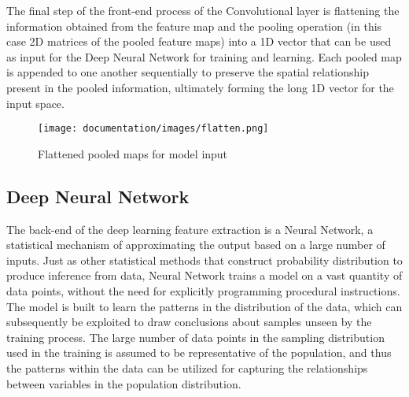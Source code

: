 \documentclass[solid,math,chem,code,plot,gloss]{bmc}
\begin{document}
The final step of the front-end process of the Convolutional layer is flattening the information obtained from the feature map and the pooling operation (in this case 2D matrices of the pooled feature maps) into a 1D vector that can be used as input for the Deep Neural Network for training and learning. Each pooled map is appended to one another sequentially to preserve the spatial relationship present in the pooled information, ultimately forming the long 1D vector for the input space.

\begin{figure}[hbt!]
    \centering
    \texttt{[image: documentation/images/flatten.png]}
    \caption{Flattened pooled maps for model input}
    \label{fig:filters}
\end{figure}

\subsection{Deep Neural Network}

The back-end of the deep learning feature extraction is a Neural Network, a statistical mechanism of approximating the output based on a large number of inputs. Just as other statistical methods that construct probability distribution to produce inference from data, Neural Network trains a model on a vast quantity of data points, without the need for explicitly programming procedural instructions. The model is built to learn the patterns in the distribution of the data, which can subsequently be exploited to draw conclusions about samples unseen by the training process. The large number of data points in the sampling distribution used in the training is assumed to be representative of the population, and thus the patterns within the data can be utilized for capturing the relationships between variables in the population distribution. 
\end{document}
